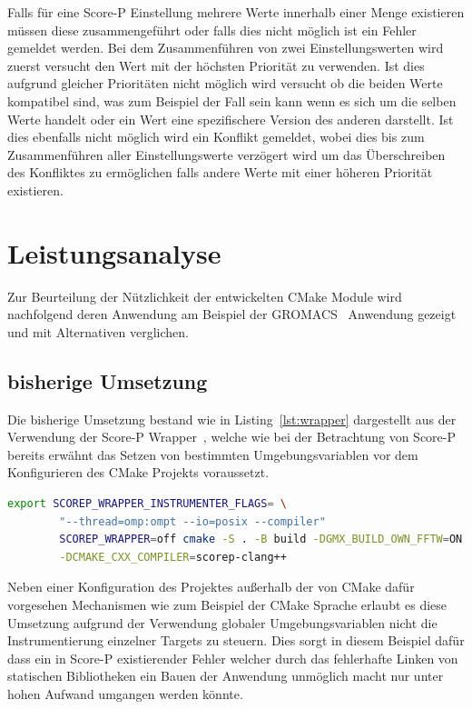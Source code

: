 \documentclass[german,proseminar,hyperref,utf8,lof]{zihpub}
\begin{document}
    Falls für eine Score-P Einstellung mehrere Werte innerhalb einer Menge existieren müssen diese
    zusammengeführt oder falls dies nicht möglich ist ein Fehler gemeldet werden.
    Bei dem Zusammenführen von zwei Einstellungswerten wird zuerst versucht den Wert mit der höchsten
    Priorität zu verwenden.
    Ist dies aufgrund gleicher Prioritäten nicht möglich wird versucht ob die beiden Werte kompatibel
    sind, was zum Beispiel der Fall sein kann wenn es sich um die selben Werte handelt oder ein
    Wert eine spezifischere Version des anderen darstellt.
    Ist dies ebenfalls nicht möglich wird ein Konflikt gemeldet, wobei dies bis zum Zusammenführen
    aller Einstellungswerte verzögert wird um das Überschreiben des Konfliktes zu ermöglichen falls
    andere Werte mit einer höheren Priorität existieren.


    \newpage
    \section{Leistungsanalyse}
    Zur Beurteilung der Nützlichkeit der entwickelten CMake Module wird nachfolgend deren Anwendung
    am Beispiel der GROMACS~\cite{gromacs} Anwendung gezeigt und mit Alternativen verglichen.

    \subsection{bisherige Umsetzung}
    Die bisherige Umsetzung bestand wie in Listing~\ref{lst:wrapper} dargestellt aus der Verwendung der
    Score-P Wrapper~, welche wie bei
    der Betrachtung von Score-P bereits erwähnt das Setzen von bestimmten Umgebungsvariablen vor dem
    Konfigurieren des CMake Projekts voraussetzt.

    \begin{lstlisting}[caption=Anwendung eines Score-P Wrapper bei GROMACS, language=bash, gobble=8, label=lst:wrapper]
        export SCOREP_WRAPPER_INSTRUMENTER_FLAGS= \
        "--thread=omp:ompt --io=posix --compiler"
        SCOREP_WRAPPER=off cmake -S . -B build -DGMX_BUILD_OWN_FFTW=ON \
        -DCMAKE_CXX_COMPILER=scorep-clang++
    \end{lstlisting}

    Neben einer Konfiguration des Projektes au{\ss}erhalb der von CMake dafür vorgesehen Mechanismen
    wie zum Beispiel der CMake Sprache erlaubt es diese Umsetzung aufgrund der Verwendung globaler
    Umgebungsvariablen nicht die Instrumentierung einzelner Targets zu steuern.
    Dies sorgt in diesem Beispiel dafür dass ein in Score-P existierender Fehler welcher durch das
    fehlerhafte Linken von statischen Bibliotheken ein Bauen der Anwendung unmöglich macht
    nur unter hohen Aufwand umgangen werden könnte.
\end{document}
